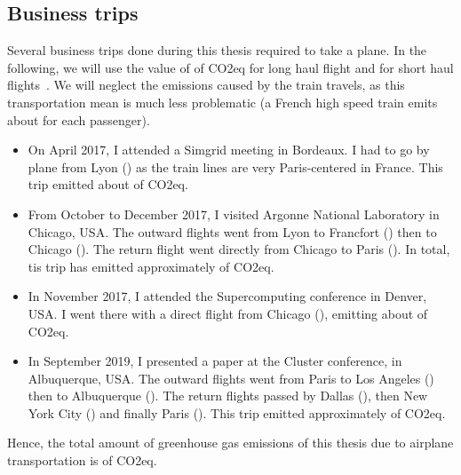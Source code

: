     \subsection*{Business trips}%

        Several business trips done during this thesis required to take a plane. In the following, we will use the value
        of  of CO2eq for long haul flight and  for short haul
        flights~\cite{co2_flight}. We will neglect the emissions caused by the train travels, as this transportation
        mean is much less problematic (a French high speed train emits about  for each
        passenger).
        \begin{itemize}
            \item On April 2017, I attended a Simgrid meeting in Bordeaux. I had to go by plane from Lyon
                () as the train lines are very Paris-centered in France. This trip emitted about
                 of CO2eq.
            \item From October to December 2017, I visited Argonne National Laboratory in Chicago, USA. The outward
                flights went from Lyon to Francfort () then to Chicago ().
                The return flight went directly from Chicago to Paris ().  In total, tis trip has
                emitted approximately  of CO2eq.
            \item In November 2017, I attended the Supercomputing conference in Denver, USA. I went there with a direct
                flight from Chicago (), emitting about  of CO2eq.
            \item In September 2019, I presented a paper at the Cluster conference, in Albuquerque, USA. The outward
                flights went from Paris to Los Angeles () then to Albuquerque
                (). The return flights passed by Dallas (), then New York
                City () and finally Paris (). This trip emitted
                approximately  of CO2eq.
        \end{itemize}
        Hence, the total amount of greenhouse gas emissions of this thesis due to airplane transportation is
         of CO2eq.

